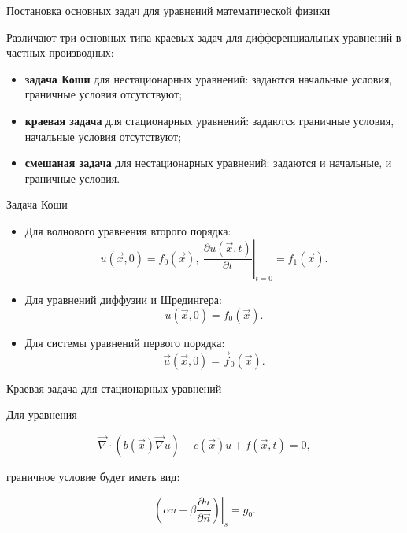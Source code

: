\documentclass[10pt,xcolor=pst,aspectratio=169]{beamer}
\begin{document}
\begin{frame}{Постановка основных задач для уравнений математической физики}

	\transdissolve[duration=0.1]
	\justifying
	\large

	Различают три основных типа краевых задач для дифференциальных уравнений в частных производных:

	\begin{itemize}
		\item \textbf{задача Коши} для нестационарных уравнений: задаются начальные условия, граничные условия отсутствуют;

		\item \textbf{краевая задача} для стационарных уравнений: задаются граничные условия, начальные условия отсутствуют;

		\item \textbf{смешаная задача} для нестационарных уравнений: задаются и начальные, и граничные условия.
	\end{itemize}

\end{frame}

\begin{frame}{Задача Коши}

	\transdissolve[duration=0.1]
	\justifying
	\large

	\begin{itemize}
		\item Для волнового уравнения второго порядка:
			\[
				u(\vec{x}, 0) = f_{0}(\vec{x}), \: \left. \frac{\partial u(\vec{x}, t)}{\partial t} \right|_{t = 0}= f_{1}(\vec{x}).
			\]

		\item Для уравнений диффузии и Шредингера:
			\[
				u(\vec{x}, 0) = f_{0}(\vec{x}).
			\]

		\item Для системы уравнений первого порядка:
			\[
				\vec{u}(\vec{x}, 0) = \vec{f}_{0}(\vec{x}).
			\]
	\end{itemize}

\end{frame}

\begin{frame}{Краевая задача для стационарных уравнений}

	\transdissolve[duration=0.1]
	\justifying
	\large

	Для уравнения 

	\[
		\vec{\nabla} \cdot \left( b(\vec{x}) \vec{\nabla} u \right) - c(\vec{x}) u + f(\vec{x}, t) = 0,
	\]

	граничное условие будет иметь вид:

	\[
		\left. \left( \alpha u + \beta \frac{\partial u}{\partial \vec{n}} \right) \right|_{s} = g_{0}.
	\]

\end{frame}
\end{document}
